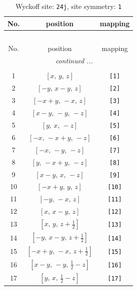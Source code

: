 \documentclass[fleqn,8pt]{jsarticle}
\begin{document}
\begin{longtable}{ccc}
\caption{Wyckoff site: {\tt 24j}, site symmetry: {\tt 1}}
 \\
 \hline \hline
No. & position & mapping \\ \hline \endfirsthead

\multicolumn{2}{l}{\tablename\ \thetable{}} \\
 \hline \hline
No. & position & mapping \\ \hline \endhead

 \hline \hline
\multicolumn{2}{r}{\footnotesize\it continued ...} \\ \endfoot

 \hline \hline
\multicolumn{2}{r}{} \\ \endlastfoot

1 & $\left[ x,\, y,\, z \right]$ & {\tt [1]} \\ \hline
2 & $\left[ - y,\, x - y,\, z \right]$ & {\tt [2]} \\ \hline
3 & $\left[ - x + y,\, - x,\, z \right]$ & {\tt [3]} \\ \hline
4 & $\left[ x - y,\, - y,\, - z \right]$ & {\tt [4]} \\ \hline
5 & $\left[ y,\, x,\, - z \right]$ & {\tt [5]} \\ \hline
6 & $\left[ - x,\, - x + y,\, - z \right]$ & {\tt [6]} \\ \hline
7 & $\left[ - x,\, - y,\, - z \right]$ & {\tt [7]} \\ \hline
8 & $\left[ y,\, - x + y,\, - z \right]$ & {\tt [8]} \\ \hline
9 & $\left[ x - y,\, x,\, - z \right]$ & {\tt [9]} \\ \hline
10 & $\left[ - x + y,\, y,\, z \right]$ & {\tt [10]} \\ \hline
11 & $\left[ - y,\, - x,\, z \right]$ & {\tt [11]} \\ \hline
12 & $\left[ x,\, x - y,\, z \right]$ & {\tt [12]} \\ \hline
13 & $\left[ x,\, y,\, z + \frac{1}{2} \right]$ & {\tt [13]} \\ \hline
14 & $\left[ - y,\, x - y,\, z + \frac{1}{2} \right]$ & {\tt [14]} \\ \hline
15 & $\left[ - x + y,\, - x,\, z + \frac{1}{2} \right]$ & {\tt [15]} \\ \hline
16 & $\left[ x - y,\, - y,\, \frac{1}{2} - z \right]$ & {\tt [16]} \\ \hline
17 & $\left[ y,\, x,\, \frac{1}{2} - z \right]$ & {\tt [17]} \\ \hline

\end{longtable}
\end{document}
